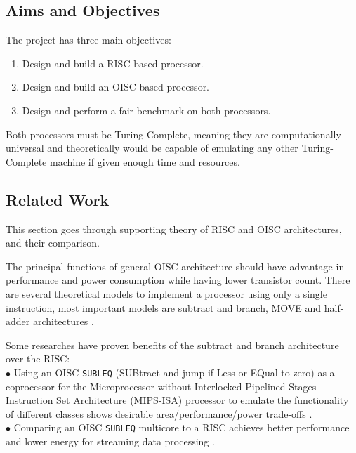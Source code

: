 \subsection{Aims and Objectives}

The project has three main objectives:
\begin{enumerate}
	\item Design and build a RISC based processor.
	\item Design and build an OISC based processor. 
	\item Design and perform a fair benchmark on both processors. 
\end{enumerate}

Both processors must be Turing-Complete, meaning they are computationally universal and theoretically would be capable of emulating any other Turing-Complete machine if given enough time and resources.

\subsection{Related Work}
\label{subsec:supporting_theory}
This section goes through supporting theory of RISC and OISC architectures, and their comparison.

The principal functions of general OISC architecture should have advantage in performance and power consumption while having lower transistor count. There are several theoretical models to implement a processor using only a single instruction, most important models are subtract and branch, MOVE and half-adder architectures \autocite{gilreath_laplante_2003}. 

Some researches have proven benefits of the subtract and branch architecture over the RISC:\\
$\bullet$ Using an OISC \texttt{SUBLEQ} (SUBtract and jump if Less or EQual to zero) as a coprocessor for the Microprocessor without Interlocked Pipelined Stages - Instruction Set Architecture (MIPS-ISA) processor to emulate the functionality of different classes shows desirable area/performance/power trade-offs \autocite{ahmed_sakamoto_anderson_hara-azumi_2015}.\\
$\bullet$ Comparing an OISC \texttt{SUBLEQ} multicore to a RISC achieves better performance and lower energy for streaming data processing \autocite{yokota_saso_hara-azumi_2017}.

